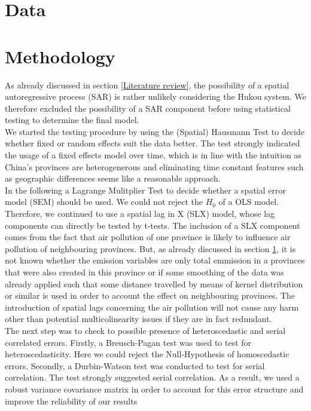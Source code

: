 \documentclass[
]{article}
\begin{document}
\section{Data} \label{Data}

\section{Methodology}
As already discussed in section \ref{Literature review}, the possibility of a spatial autoregressive process (SAR) is rather unlikely considering the Hukou system. We therefore excluded the possibility of a SAR component before using statistical testing to determine the final model.\\
We started the testing procedure by using the (Spatial) Hausmann Test to decide whether fixed or random effects suit the data better. The test strongly indicated the usage of a fixed effects model over time, which is in line with the intuition as China's provinces are heterogenerous and eliminating time constant features such as geographic differences seems like a reasonable approach.\\
In the following a Lagrange Mulitplier Test to decide whether a spatial error model (SEM) should be used. We could not reject the $H_0$ of a OLS model. Therefore, we continued to use a spatial lag in X (SLX) model, whose lag components can directly be tested by t-tests. The inclusion of a SLX component comes from the fact that air pollution of one province is likely to influence air pollution of neighbouring provinces. But, as already discussed in section \ref{Data}, it is not known whether the emission variables are only total emmission in a provinces that were also created in this province or if some smoothing of the data was already applied such that some distance travelled by means of kernel distribution or similar is used in order to account the effect on neighbouring provinces. The introduction of spatial lags concerning the air pollution will not cause any harm other than potential multicolinearity issues if they are in fact redundant.\\
The next step was to check to possible presence of heteroscedastic and serial correlated errors. Firstly, a Breusch-Pagan test was used to test for heteroscedasticity. Here we could reject the Null-Hypothesis of homoscedastic errors. Secondly, a Durbin-Watson test was conducted to test for serial correlation. The test strongly suggested serial correlation. As a result, we used a robust variance covariance matrix in order to account for this error structure and improve the reliability of our results\\
\end{document}
